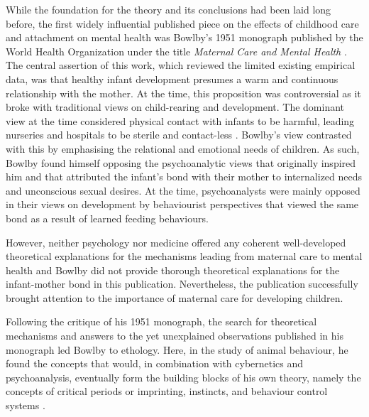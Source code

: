 \documentclass[12pt]{report}
\begin{document}
While the foundation for the theory and its conclusions had been laid long before, the first widely influential published piece on the effects of childhood care and attachment on mental health was Bowlby's 1951 monograph published by the World Health Organization under the title \textit{Maternal Care and Mental Health} \cite{bowlby1951WHO}.
The central assertion of this work, which reviewed the limited existing empirical data, was that healthy infant development presumes a warm and continuous relationship with the mother.
At the time, this proposition was controversial as it broke with traditional views on child-rearing and development. The dominant view at the time considered physical contact with infants to be harmful, leading nurseries and hospitals to be sterile and contact-less \cite{Karen1994}.
Bowlby's view contrasted with this by emphasising the relational and emotional needs of children. As such, Bowlby found himself opposing the psychoanalytic views that originally inspired him and that attributed the infant's bond with their mother to internalized needs and unconscious sexual desires.
At the time, psychoanalysts were mainly opposed in their views on development by behaviourist perspectives that viewed the same bond as a result of learned feeding behaviours.

However, neither psychology nor medicine offered any coherent well-\-developed theoretical explanations for the mechanisms leading from maternal care to mental health \cite{Bowlby1988, who1962deprivation} and Bowlby did not provide thorough theoretical explanations for the infant-mother bond in this publication.
Nevertheless, the publication successfully brought attention to the importance of maternal care for developing children.

Following the critique of his 1951 monograph, the search for theoretical mechanisms and answers to the yet unexplained observations published in his monograph led Bowlby to ethology. Here, in the study of animal behaviour, he found the concepts that would, in combination with cybernetics and psychoanalysis, eventually form the building blocks of his own theory, namely the concepts of critical periods or imprinting, instincts, and behaviour control systems \cite{Bowlby1988,bowlby1953critical}.
\end{document}
